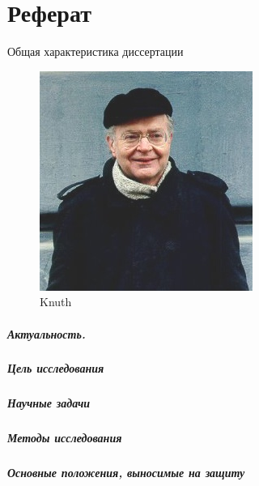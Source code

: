 \chapter*{Реферат}

\begin{center}
    Общая характеристика диссертации
\end{center}

\begin{figure}
    \centering
    \includegraphics[width=0.6\linewidth]{images/knuth}
    \caption{Knuth}
    \label{fig:my_label2}
\end{figure}



\paragraph*{Актуальность.}

\paragraph*{Цель исследования}
\paragraph*{Научные задачи}

\paragraph*{Методы исследования}


\paragraph*{Основные положения, выносимые на защиту}
